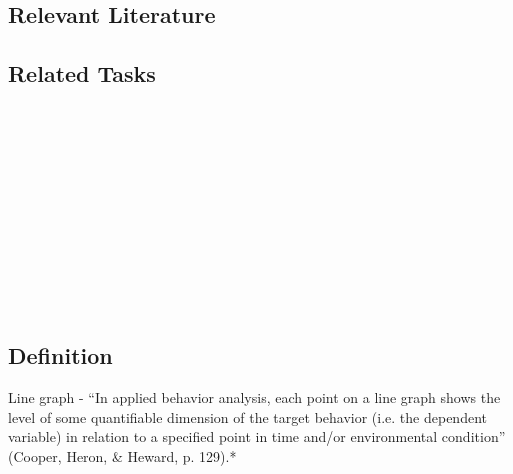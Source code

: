 \subsection{Relevant Literature}
\begin{refsection}
\nocite{test,alang2017police,clayton2018black}
\printbibliography[heading=none]
\end{refsection}
%
\subsection{Related Tasks}
\fouraOne{}\\
\fouraTwo{}\\
\fouraThree{}\\
\fouraFour{}\\
\fouraFive{}\\
\fouraSix{}\\
\fouraSeven{}\\
\fouraEight{}\\
\fourhOne{}\\
\fourhTwo{}\\
% 
%
%
%
%
%
\section[\fouraTen{}]{\fouraTen{}%
              }
\subsection{Definition}
Line graph - ``In applied behavior analysis, each point on a line graph shows the level of some quantifiable dimension of the target behavior (i.e. the dependent variable) in relation to a specified point in time and/or environmental condition'' (Cooper, Heron, \& Heward, p. 129).*\\

